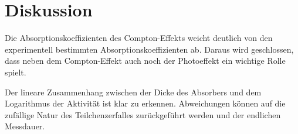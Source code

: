 \section{Diskussion}
\label{sec:Diskussion}

Die Absorptionskoeffizienten des Compton-Effekts weicht deutlich von den experimentell bestimmten Absorptionskoeffizienten ab.
Daraus wird geschlossen, dass neben dem Compton-Effekt auch noch der Photoeffekt ein wichtige Rolle spielt.

Der lineare Zusammenhang zwischen der Dicke des Absorbers und dem Logarithmus der Aktivität ist klar zu erkennen.
Abweichungen können auf die zufällige Natur des Teilchenzerfalles zurückgeführt werden und der endlichen Messdauer.
